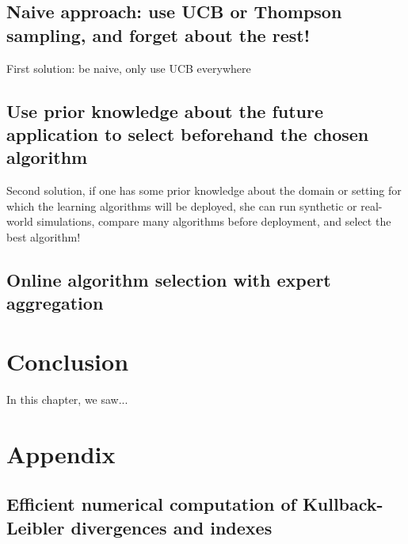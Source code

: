 \subsection{Naive approach: use UCB or Thompson sampling, and forget about the rest!}
First solution: be naive, only use UCB everywhere

\subsection{Use prior knowledge about the future application to select beforehand the chosen algorithm}
Second solution, if one has some prior knowledge about the domain or setting for which the learning algorithms will be deployed, she can run synthetic or real-world simulations, compare many algorithms before deployment, and select the best algorithm!

\subsection{Online algorithm selection with expert aggregation}






\section{Conclusion}
\label{sec:2:conclusion}

In this chapter, we saw...




\section{Appendix}
\label{sec:2:appendix}


\subsection{Efficient numerical computation of Kullback-Leibler divergences and \klUCB{} indexes}

